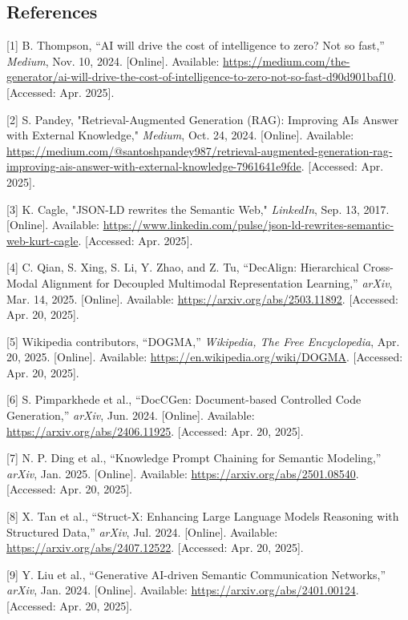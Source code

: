 \documentclass[conference]{IEEEtran}
\begin{document}
\subsection{References}\label{references}

{[}1{]} B. Thompson, ``AI will drive the cost of intelligence to zero?
Not so fast,'' \emph{Medium}, Nov. 10, 2024. {[}Online{]}. Available:
\url{https://medium.com/the-generator/ai-will-drive-the-cost-of-intelligence-to-zero-not-so-fast-d90d901baf10}.
{[}Accessed: Apr. 2025{]}.

{[}2{]} S. Pandey, "Retrieval-Augmented Generation (RAG): Improving
AI\textquotesingle s Answer with External Knowledge," \emph{Medium},
Oct. 24, 2024. {[}Online{]}. Available:
\url{https://medium.com/@santoshpandey987/retrieval-augmented-generation-rag-improving-ais-answer-with-external-knowledge-7961641e9fde}.
{[}Accessed: Apr. 2025{]}.

{[}3{]} K. Cagle, "JSON-LD rewrites the Semantic Web," \emph{LinkedIn},
Sep. 13, 2017. {[}Online{]}. Available:
\url{https://www.linkedin.com/pulse/json-ld-rewrites-semantic-web-kurt-cagle}.
{[}Accessed: Apr. 2025{]}.

{[}4{]} C. Qian, S. Xing, S. Li, Y. Zhao, and Z. Tu, ``DecAlign:
Hierarchical Cross-Modal Alignment for Decoupled Multimodal
Representation Learning,'' \emph{arXiv}, Mar. 14, 2025. {[}Online{]}.
Available: \url{https://arxiv.org/abs/2503.11892}. {[}Accessed: Apr. 20,
2025{]}.

{[}5{]} Wikipedia contributors, ``DOGMA,'' \emph{Wikipedia, The Free
Encyclopedia}, Apr. 20, 2025. {[}Online{]}. Available:
\url{https://en.wikipedia.org/wiki/DOGMA}. {[}Accessed: Apr. 20,
2025{]}.

{[}6{]} S. Pimparkhede et al., ``DocCGen: Document-based Controlled Code
Generation,'' \emph{arXiv}, Jun. 2024. {[}Online{]}. Available:
\url{https://arxiv.org/abs/2406.11925}. {[}Accessed: Apr. 20, 2025{]}.

{[}7{]} N. P. Ding et al., ``Knowledge Prompt Chaining for Semantic
Modeling,'' \emph{arXiv}, Jan. 2025. {[}Online{]}. Available:
\url{https://arxiv.org/abs/2501.08540}. {[}Accessed: Apr. 20, 2025{]}.

{[}8{]} X. Tan et al., ``Struct-X: Enhancing Large Language Models
Reasoning with Structured Data,'' \emph{arXiv}, Jul. 2024. {[}Online{]}.
Available: \url{https://arxiv.org/abs/2407.12522}. {[}Accessed: Apr. 20,
2025{]}.

{[}9{]} Y. Liu et al., ``Generative AI-driven Semantic Communication
Networks,'' \emph{arXiv}, Jan. 2024. {[}Online{]}. Available:
\url{https://arxiv.org/abs/2401.00124}. {[}Accessed: Apr. 20, 2025{]}.
\end{document}
